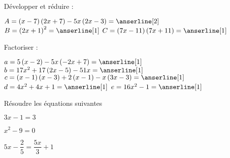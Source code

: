\documentclass[a4paper,addpoints,12pt]{exam}
\begin{document}
\devoir[sem=2,prv=false,ds=true,num=4 ,niv=2 ,date=02/03/2023]

\begin{exo}[6]
\begin{questions}
\question Développer et réduire :

\(
A=\left(x-7\right)\left(2x+7\right)-5x\left(2x-3\right)=\anserline[2]
\)
\(
B=\left(2x+1\right)^{2}=\anserline[1]
\)
\(
C=\left(7x-11\right)\left(7x+11\right)=\anserline[1]
\)
\end{questions}
\end{exo}

\begin{exo}[8]
\begin{questions}
\question Factoriser :

\(
a=5\left(x-2\right)-5x\left(-2x+7\right)=\anserline[1]
\)
\(
b=17x^{2}+17\left(2x-5\right)-51x=\anserline[1]
\)
\(
c=\left(x-1\right)\left(x-3\right)+2\left(x-1\right)-x\left(3x-3\right)=\anserline[1]
\)
\(
d=4x^{2}+4x+1=\anserline[1]
\)
\(
e=16x^{2}-1=\anserline[1]
\)
\end{questions}
\end{exo}

\begin{exo}[6]
\begin{questions}
\question Résoudre les équations suivantes 
\end{questions}
\begin{multicols}{3}
\(3x-1=3\)\newline
\anserline[4]
\columnbreak

\(x^{2}-9=0\)\newline
\anserline[4]
\columnbreak

\(5x-\dfrac{2}{5}=\dfrac{5x}{3}+1\)\newline
\anserline[4]
\end{multicols}
\end{exo}
\end{document}
